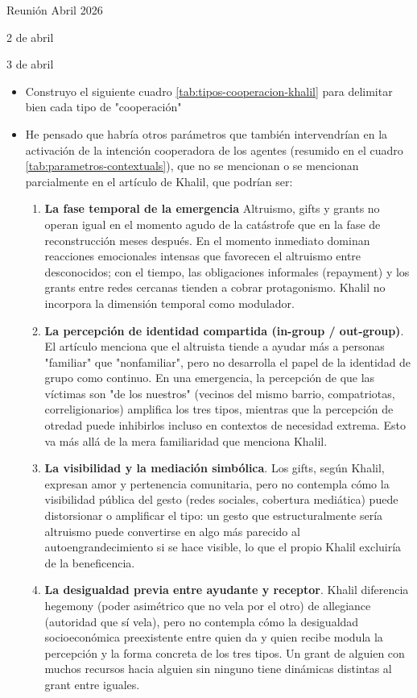 \documentclass[a4paper,11pt]{article}
\begin{document}
\begin{seccionbox}[violetasuave]{Reunión Abril 2026}
\begin{updateo}{2 de abril}
\begin{itemize}
            \end{itemize}        
        \end{updateo}
        \begin{updateo}{3 de abril}
            \begin{itemize}
                \item Construyo el siguiente cuadro \ref{tab:tipos-cooperacion-khalil} para delimitar bien cada tipo de "cooperación"
                \item He pensado que habría otros parámetros que también intervendrían en la activación de la intención cooperadora de los agentes (resumido en el cuadro \ref{tab:parametros-contextuals}), que no se mencionan o se mencionan parcialmente en el artículo de Khalil, que podrían ser:
                \begin{enumerate}
                    \item \textbf{La fase temporal de la emergencia} Altruismo, gifts y grants no operan igual en el momento agudo de la catástrofe que en la fase de reconstrucción meses después. En el momento inmediato dominan reacciones emocionales intensas que favorecen el altruismo entre desconocidos; con el tiempo, las obligaciones informales (repayment) y los grants entre redes cercanas tienden a cobrar protagonismo. Khalil no incorpora la dimensión temporal como modulador.
                    \item \textbf{La percepción de identidad compartida (in-group / out-group)}. El artículo menciona que el altruista tiende a ayudar más a personas "familiar" que "nonfamiliar", pero no desarrolla el papel de la identidad de grupo como continuo. En una emergencia, la percepción de que las víctimas son "de los nuestros" (vecinos del mismo barrio, compatriotas, correligionarios) amplifica los tres tipos, mientras que la percepción de otredad puede inhibirlos incluso en contextos de necesidad extrema. Esto va más allá de la mera familiaridad que menciona Khalil.
                    \item \textbf{La visibilidad y la mediación simbólica}. Los gifts, según Khalil, expresan amor y pertenencia comunitaria, pero no contempla cómo la visibilidad pública del gesto (redes sociales, cobertura mediática) puede distorsionar o amplificar el tipo: un gesto que estructuralmente sería altruismo puede convertirse en algo más parecido al autoengrandecimiento si se hace visible, lo que el propio Khalil excluiría de la beneficencia.
                    \item \textbf{La desigualdad previa entre ayudante y receptor}. Khalil diferencia hegemony (poder asimétrico que no vela por el otro) de allegiance (autoridad que sí vela), pero no contempla cómo la desigualdad socioeconómica preexistente entre quien da y quien recibe modula la percepción y la forma concreta de los tres tipos. Un grant de alguien con muchos recursos hacia alguien sin ninguno tiene dinámicas distintas al grant entre iguales.

\end{enumerate}
\end{itemize}
\end{updateo}
\end{seccionbox}
\end{document}
